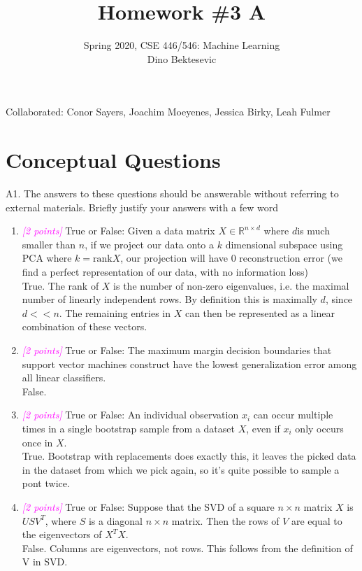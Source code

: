\documentclass{article}
\date{{}}
\newcommand{\field}[1]{\mathbb{#1}}
\newcommand{\1}{\mathbf{1}}
\newcommand{\R}{\field{R}} %
\newcommand{\points}[1]{\small\textcolor{magenta}{\emph{[#1 points]}} \normalsize}
\begin{document}
\title{Homework \#3 A}
\author{\normalsize{Spring 2020, CSE 446/546: Machine Learning}\\
\normalsize{Dino Bektesevic}}
\maketitle

Collaborated: Conor Sayers, Joachim Moeyenes, Jessica Birky, Leah Fulmer

\section*{Conceptual Questions}
A1. The answers to these questions should be answerable without referring to external materials.  Briefly justify your answers with a few word
\begin{enumerate}
\item \points{2} True or False: Given a data matrix $X\in \R^{n\times d}$ where $d$is much smaller than $n$, if we project our data onto a $k$ dimensional subspace using PCA where $k=\text{rank} X$, our projection will have 0 reconstruction error (we find a perfect representation of our data, with no information loss)\\
True. The rank of $X$ is the number of non-zero eigenvalues, i.e. the maximal number of linearly independent rows. By definition this is maximally $d$, since $d<<n$. The remaining entries in $X$ can then be represented as a linear combination of these vectors.

\item \points{2} True or False: The maximum margin decision boundaries that support vector machines construct have the lowest generalization error among all linear classifiers.\\
False. 

\item \points{2} True or False: An individual observation $x_i$ can occur multiple times in a single bootstrap sample from a dataset $X$, even if $x_i$ only occurs once in $X$. \\
True. Bootstrap with replacements does exactly this, it leaves the picked data in the dataset from which we pick again, so it's quite possible to sample a pont twice. \\

\item \points{2} True or False: Suppose that the SVD of a square $n\times n$ matrix $X$ is $USV^T$, where $S$ is a diagonal $n\times n$ matrix. Then the rows of $V$ are equal to the eigenvectors of $X^TX$. \\
False. Columns are eigenvectors, not rows. This follows from the definition of V in SVD.


\end{enumerate}
\end{document}

